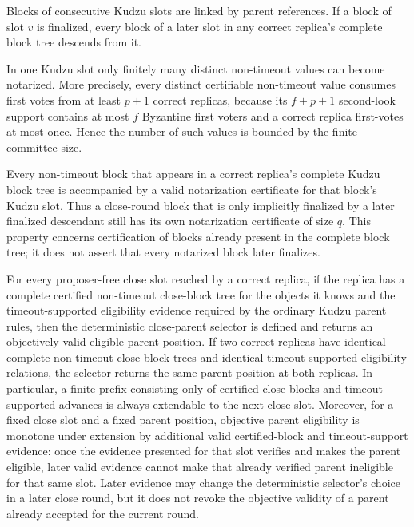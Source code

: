 \documentclass[11pt]{article}
\theoremstyle{definition}
\theoremstyle{remark}
\begin{document}
\begin{description}[leftmargin=2.4em,labelindent=0em]
\item[K6 (chain safety).]
Blocks of consecutive Kudzu slots are linked by parent references. If a block of slot $v$ is finalized, every block of a later slot in any correct replica's complete block tree descends from it.

\item[K7 (finitely many certifiable values per slot).]
In one Kudzu slot only finitely many distinct non-timeout values can become notarized. More precisely, every distinct certifiable non-timeout value consumes first votes from at least $p+1$ correct replicas, because its $f+p+1$ second-look support contains at most $f$ Byzantine first voters and a correct replica first-votes at most once. Hence the number of such values is bounded by the finite committee size.

\item[K8 (complete-tree certification).]
Every non-timeout block that appears in a correct replica's complete Kudzu block tree is accompanied by a valid notarization certificate for that block's Kudzu slot. Thus a close-round block that is only implicitly finalized by a later finalized descendant still has its own notarization certificate of size $q$. This property concerns certification of blocks already present in the complete block tree; it does not assert that every notarized block later finalizes.

\item[K9 (close-parent extendability and round-validity monotonicity).]
For every proposer-free close slot reached by a correct replica, if the replica has a complete certified non-timeout close-block tree for the objects it knows and the timeout-supported eligibility evidence required by the ordinary Kudzu parent rules, then the deterministic close-parent selector is defined and returns an objectively valid eligible parent position. If two correct replicas have identical complete non-timeout close-block trees and identical timeout-supported eligibility relations, the selector returns the same parent position at both replicas. In particular, a finite prefix consisting only of certified close blocks and timeout-supported advances is always extendable to the next close slot. Moreover, for a fixed close slot and a fixed parent position, objective parent eligibility is monotone under extension by additional valid certified-block and timeout-support evidence: once the evidence presented for that slot verifies and makes the parent eligible, later valid evidence cannot make that already verified parent ineligible for that same slot. Later evidence may change the deterministic selector's choice in a later close round, but it does not revoke the objective validity of a parent already accepted for the current round.
\end{description}
\end{document}
